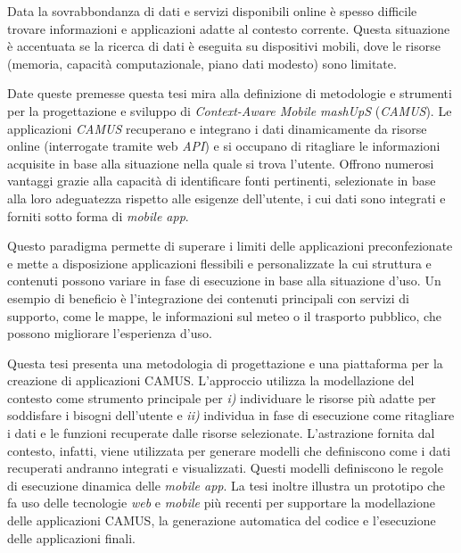 Data la sovrabbondanza di dati e servizi disponibili online è spesso difficile trovare informazioni e applicazioni adatte al contesto corrente. Questa situazione è accentuata se la ricerca di dati è eseguita su dispositivi mobili, dove le risorse (memoria, capacità computazionale, piano dati modesto) sono limitate.

Date queste premesse questa tesi mira alla definizione di metodologie e strumenti per la progettazione e sviluppo di \emph{Context-Aware Mobile mashUpS} (\emph{CAMUS}). Le applicazioni \emph{CAMUS} recuperano e integrano i dati dinamicamente da risorse online (interrogate tramite web \emph{API}) e si occupano di ritagliare le informazioni acquisite in base alla situazione nella quale si trova l'utente. Offrono numerosi vantaggi grazie alla capacità di identificare fonti pertinenti, selezionate in base alla loro adeguatezza rispetto alle esigenze dell'utente, i cui dati sono integrati e forniti sotto forma di \emph{mobile app}.

Questo paradigma permette di superare i limiti delle applicazioni preconfezionate e mette a disposizione applicazioni flessibili e personalizzate la cui struttura e contenuti possono variare in fase di esecuzione in base alla situazione d'uso. Un esempio di beneficio è l'integrazione dei contenuti principali con servizi di supporto, come le mappe, le informazioni sul meteo o il trasporto pubblico, che possono migliorare l'esperienza d'uso.

Questa tesi presenta una metodologia di progettazione e una piattaforma per la creazione di applicazioni CAMUS. L'approccio utilizza la modellazione del contesto come strumento principale per \emph{i)} individuare le risorse più adatte per soddisfare i bisogni dell'utente e \emph{ii)} individua in fase di esecuzione come ritagliare i dati e le funzioni recuperate dalle risorse selezionate. L'astrazione fornita dal contesto, infatti, viene utilizzata per generare modelli che definiscono come i dati recuperati andranno integrati e visualizzati. Questi modelli definiscono le regole di esecuzione dinamica delle \emph{mobile app}. La tesi inoltre illustra un prototipo che fa uso delle tecnologie \emph{web} e \emph{mobile} più recenti per supportare la modellazione delle applicazioni CAMUS, la generazione automatica del codice e l'esecuzione delle applicazioni finali.